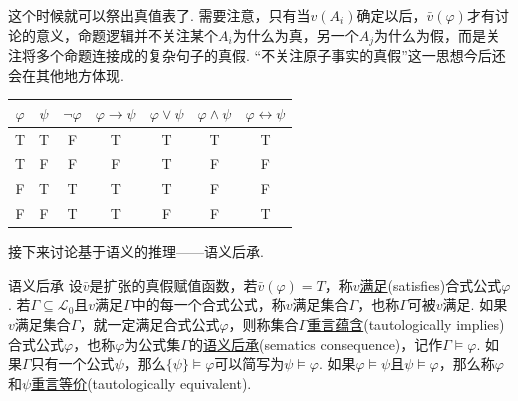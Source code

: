 这个时候就可以祭出真值表了. 需要注意，只有当\(v(A_i)\)确定以后，\(\bar v(\varphi)\)才有讨论的意义，命题逻辑并不关注某个\(A_i\)为什么为真，另一个\(A_j\)为什么为假，而是关注将多个命题连接成的复杂句子的真假. “不关注原子事实的真假”这一思想今后还会在其他地方体现.

\begin{center}
    \begin{tabular}{cc|ccccc}
        \hline
        \(\varphi\) & \(\psi\) & \(\neg \varphi\) & \(\varphi \to \psi\) & \(\varphi \vee \psi\) & \(\varphi \wedge \psi\) & \(\varphi \leftrightarrow \psi\) \\
        \hline
        T & T & F & T & T & T & T \\
        T & F & F & F & T & F & F \\
        F & T & T & T & T & F & F \\
        F & F & T & T & F & F & T \\
        \hline
    \end{tabular}
\end{center}

接下来讨论基于语义的推理——语义后承.

\begin{definition}{语义后承}
    设\(\bar v\)是扩张的真假赋值函数，若\(\bar v(\varphi) = T\)，称\(v\)\underline{满足}(satisfies)合式公式\(\varphi\). \newline
    若\(\Gamma \subseteq \mathcal{L}_0\)且\(v\)满足\(\Gamma\)中的每一个合式公式，称\(v\)满足集合\(\Gamma\)，也称\(\Gamma\)可被\(v\)满足. \newline
    如果\(v\)满足集合\(\Gamma\)，就一定满足合式公式\(\varphi\)，则称集合\(\Gamma\)\underline{重言蕴含}(tautologically implies)合式公式\(\varphi\)，也称\(\varphi\)为公式集\(\Gamma\)的\underline{语义后承}(sematics consequence)，记作\(\Gamma \vDash \varphi\). \newline
    如果\(\Gamma\)只有一个公式\(\psi\)，那么\(\{\psi\} \vDash \varphi\)可以简写为\(\psi \vDash \varphi\). 如果\(\varphi \vDash \psi\)且\(\psi \vDash \varphi\)，那么称\(\varphi\)和\(\psi\)\underline{重言等价}(tautologically equivalent).
\end{definition}

